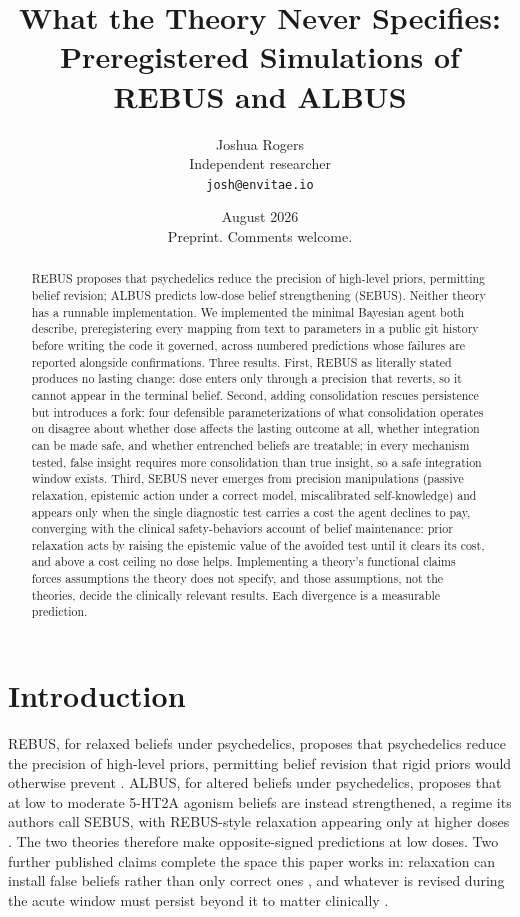 \documentclass[11pt]{article}
\title{\textbf{What the Theory Never Specifies:\\
Preregistered Simulations of REBUS and ALBUS}}
\author{Joshua Rogers\\ \small Independent researcher \\ \small \texttt{josh@envitae.io}}
\date{August 2026 \\ \small Preprint. Comments welcome.}
\begin{document}
\maketitle

\begin{abstract}
\noindent REBUS proposes that psychedelics reduce the precision of high-level
priors, permitting belief revision; ALBUS predicts low-dose belief strengthening
(SEBUS). Neither theory has a runnable implementation. We implemented the minimal
Bayesian agent both describe, preregistering every mapping from text to
parameters in a public git history before writing the code it governed, across
numbered predictions whose failures are reported alongside confirmations. Three
results. First, REBUS as literally stated produces no lasting change: dose enters
only through a precision that reverts, so it cannot appear in the terminal
belief. Second, adding consolidation rescues persistence but introduces a fork:
four defensible parameterizations of what consolidation operates on disagree
about whether dose affects the lasting outcome at all, whether integration can be
made safe, and whether entrenched beliefs are treatable; in every mechanism
tested, false insight requires more consolidation than true insight, so a safe
integration window exists. Third, SEBUS never emerges from precision
manipulations (passive relaxation, epistemic action under a correct model,
miscalibrated self-knowledge) and appears only when the single diagnostic test
carries a cost the agent declines to pay, converging with the clinical
safety-behaviors account of belief maintenance: prior relaxation acts by raising
the epistemic value of the avoided test until it clears its cost, and above a
cost ceiling no dose helps. Implementing a theory's functional claims forces
assumptions the theory does not specify, and those assumptions, not the theories,
decide the clinically relevant results. Each divergence is a measurable
prediction.
\end{abstract}

\section{Introduction}

REBUS, for relaxed beliefs under psychedelics, proposes that psychedelics reduce the
precision of high-level priors, permitting belief revision that rigid priors would
otherwise prevent \cite{carhart2019}. ALBUS, for altered beliefs under psychedelics,
proposes that at low to moderate 5-HT2A agonism beliefs are instead strengthened, a
regime its authors call SEBUS, with REBUS-style relaxation appearing only at higher
doses \cite{safron2025}. The two theories therefore make opposite-signed predictions
at low doses. Two further published claims complete the space this paper works in:
relaxation can install false beliefs rather than only correct ones \cite{mcgovern2024},
and whatever is revised during the acute window must persist beyond it to matter
clinically \cite{zeifman2025}.
\end{document}
